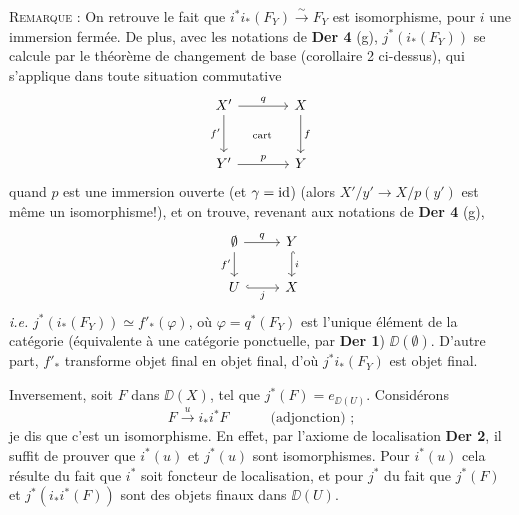 \noindent\textsc{Remarque} : On retrouve le fait que $i^*i_*(F_Y) \overset{\sim}{\to} F_Y$ est isomorphisme, pour $i$ une immersion fermée. De plus, avec les notations de \textbf{Der 4} (g), $j^*(i_*(F_Y))$ se calcule par le théorème de changement de base (corollaire 2 ci-dessus), qui s'applique dans toute situation commutative
\[
\begin{tikzcd}[row sep=large, column sep=large]
X' \arrow[r, "q"] \arrow[d, "f'"'] \arrow[dr, phantom, "\text{\scriptsize cart}"] & X \arrow[d, "f"] \\
Y' \arrow[r, "p"] & Y
\end{tikzcd}
\]
quand $p$ est une immersion ouverte (et $\gamma = \mathrm{id}$) (alors $X'/y' \to X/p(y')$ est même un isomorphisme!), et on trouve, revenant aux notations de \textbf{Der 4} (g),
\[
\begin{tikzcd}
\emptyset \arrow[r, "q"] \arrow[d, "f'"'] & Y \arrow[d, hook, "i"] \\
U \arrow[r, hook, "j"'] & X
\end{tikzcd}
\]
\textit{i.e.} $j^*(i_*(F_Y)) \simeq f'_*(\varphi)$, où $\varphi = q^*(F_Y)$ est l'unique élément de la catégorie (équivalente à une catégorie ponctuelle, par \textbf{Der 1}) $\DD(\emptyset)$. D'autre part, $f'_*$ transforme objet final en objet final, d'où $j^*i_*(F_Y)$ est objet final.

Inversement, soit $F$ dans $\DD(X)$, tel que $j^*(F) = e_{\DD(U)}$. Considérons
\[
F \xrightarrow{u} i_*i^*F \qquad\quad \text{(adjonction) ;}
\]
je dis que c'est un isomorphisme. En effet, par l'axiome  de localisation \textbf{Der 2}, il suffit de prouver que $i^*(u)$ et $j^*(u)$ sont isomorphismes. Pour $i^*(u)$ cela résulte du fait que $i^*$ soit foncteur de localisation, et pour $j^*$ du fait que $j^*(F)$ et $j^*(i_*i^*(F))$ sont des objets finaux dans $\DD(U)$.


\noindent{}

